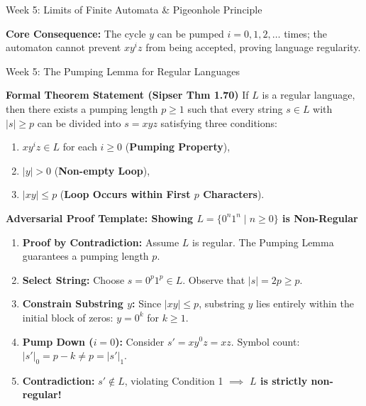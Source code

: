 \documentclass[aspectratio=169, 10pt]{beamer}
\begin{document}
\begin{frame}{Week 5: Limits of Finite Automata \& Pigeonhole Principle}
  \vspace{0.06cm}
  \begin{center}
    \parbox{0.94\textwidth}{%
      \centering\footnotesize\color{gimpanavy}
      \textbf{Core Consequence:} The cycle $y$ can be pumped $i = 0, 1, 2, \dots$ times; the automaton cannot prevent $x y^i z$ from being accepted, proving language regularity.
    }
  \end{center}
\end{frame}

\begin{frame}{Week 5: The Pumping Lemma for Regular Languages}
  \begin{tcolorbox}[conceptcard]
    {\bfseries\footnotesize\color{gimpanavy} Formal Theorem Statement (Sipser Thm 1.70)}
    \vspace{0.04cm}
    \footnotesize
    If $L$ is a regular language, then there exists a pumping length $p \ge 1$ such that every string $s \in L$ with $|s| \ge p$ can be divided into $s = xyz$ satisfying three conditions:
    \begin{enumerate}\setlength{\itemsep}{1pt}
      \item $x y^i z \in L$ for each $i \ge 0$ \quad (\textbf{Pumping Property}),
      \item $|y| > 0$ \quad (\textbf{Non-empty Loop}),
      \item $|xy| \le p$ \quad (\textbf{Loop Occurs within First $p$ Characters}).
    \end{enumerate}
  \end{tcolorbox}

  \vspace{0.06cm}
  \begin{tcolorbox}[alertcard]
    {\bfseries\footnotesize\color{accentCrimson} Adversarial Proof Template: Showing $L = \{0^n 1^n \mid n \ge 0\}$ is Non-Regular}
    \vspace{0.04cm}
    \begin{enumerate}\setlength{\itemsep}{1.5pt}\scriptsize
      \item \textbf{Proof by Contradiction:} Assume $L$ is regular. The Pumping Lemma guarantees a pumping length $p$.
      \item \textbf{Select String:} Choose $s = 0^p 1^p \in L$. Observe that $|s| = 2p \ge p$.
      \item \textbf{Constrain Substring $y$:} Since $|xy| \le p$, substring $y$ lies entirely within the initial block of zeros: $y = 0^k$ for $k \ge 1$.
      \item \textbf{Pump Down ($i = 0$):} Consider $s' = x y^0 z = x z$. Symbol count: $|s'|_0 = p - k \neq p = |s'|_1$.
      \item \textbf{Contradiction:} $s' \notin L$, violating Condition 1 $\implies$ \textbf{$L$ is strictly non-regular!}
    \end{enumerate}
  \end{tcolorbox}
\end{frame}
\end{document}
